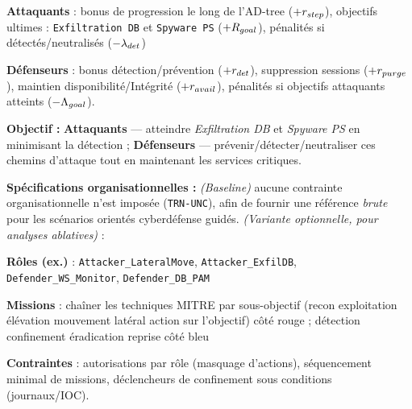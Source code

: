 \begin{enumerate*}[label={\roman*)}, itemjoin={; \quad}]
  \begin{enumerate*}[label={\alph*)}, itemjoin={; \ }]
    \item \textbf{Attaquants} : bonus de progression le long de l’AD-tree ($+r_{\small step}$), objectifs ultimes : \texttt{Exfiltration DB} et \texttt{Spyware PS} ($+R_{\small goal}$), pénalités si détectés/neutralisés ($-\lambda_{\small det}$)
    \item \textbf{Défenseurs} : bonus détection/prévention ($+r_{\small det}$), suppression sessions ($+r_{\small purge}$), maintien disponibilité/Intégrité ($+r_{\small avail}$), pénalités si objectifs attaquants atteints ($-\Lambda_{\small goal}$).
  \end{enumerate*}
  \item \textbf{Objectif :} \textbf{Attaquants} — atteindre \emph{Exfiltration DB} et \emph{Spyware PS} en minimisant la détection ; \textbf{Défenseurs} — prévenir/détecter/neutraliser ces chemins d’attaque tout en maintenant les services critiques.
\end{enumerate*}

\medskip
\textbf{Spécifications organisationnelles :} \emph{(Baseline)} aucune contrainte organisationnelle n’est imposée (\texttt{TRN-UNC}), afin de fournir une référence \emph{brute} pour les scénarios orientés cyberdéfense guidés. \emph{(Variante optionnelle, pour analyses ablatives)} :
\begin{enumerate*}[label={\roman*)}, itemjoin={; \quad}]
  \item \textbf{Rôles (ex.)} : \texttt{Attacker\_LateralMove}, \texttt{Attacker\_ExfilDB}, \texttt{Defender\_WS\_Monitor}, \texttt{Defender\_DB\_PAM}
  \item \textbf{Missions} : chaîner les techniques MITRE par sous-objectif (recon \textrightarrow{} exploitation \textrightarrow{} élévation \textrightarrow{} mouvement latéral \textrightarrow{} action sur l’objectif) côté rouge ; détection \textrightarrow{} confinement \textrightarrow{} éradication \textrightarrow{} reprise côté bleu
  \item \textbf{Contraintes} : autorisations par rôle (masquage d’actions), séquencement minimal de missions, déclencheurs de confinement sous conditions (journaux/IOC).
\end{enumerate*}

